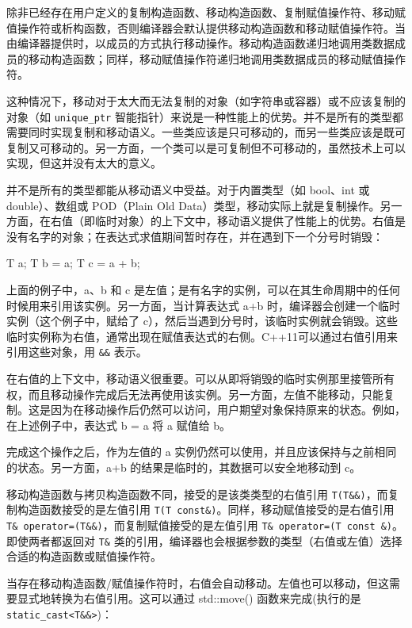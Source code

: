 
除非已经存在用户定义的复制构造函数、移动构造函数、复制赋值操作符、移动赋值操作符或析构函数，否则编译器会默认提供移动构造函数和移动赋值操作符。当由编译器提供时，以成员的方式执行移动操作。移动构造函数递归地调用类数据成员的移动构造函数；同样，移动赋值操作符递归地调用类数据成员的移动赋值操作符。

这种情况下，移动对于太大而无法复制的对象（如字符串或容器）或不应该复制的对象（如 \verb|unique_ptr| 智能指针）来说是一种性能上的优势。并不是所有的类型都需要同时实现复制和移动语义。一些类应该是只可移动的，而另一些类应该是既可复制又可移动的。另一方面，一个类可以是可复制但不可移动的，虽然技术上可以实现，但这并没有太大的意义。

并不是所有的类型都能从移动语义中受益。对于内置类型（如 bool、int 或 double）、数组或 POD（Plain Old Data）类型，移动实际上就是复制操作。另一方面，在右值（即临时对象）的上下文中，移动语义提供了性能上的优势。右值是没有名字的对象；在表达式求值期间暂时存在，并在遇到下一个分号时销毁：

\begin{cpp}
T a;
T b = a;
T c = a + b;
\end{cpp}

上面的例子中，a、b 和 c 是左值；是有名字的实例，可以在其生命周期中的任何时候用来引用该实例。另一方面，当计算表达式 a+b 时，编译器会创建一个临时实例（这个例子中，赋给了 c），然后当遇到分号时，该临时实例就会销毁。这些临时实例称为右值，通常出现在赋值表达式的右侧。C++11可以通过右值引用来引用这些对象，用 \verb|&&| 表示。

在右值的上下文中，移动语义很重要。可以从即将销毁的临时实例那里接管所有权，而且移动操作完成后无法再使用该实例。另一方面，左值不能移动，只能复制。这是因为在移动操作后仍然可以访问，用户期望对象保持原来的状态。例如，在上述例子中，表达式 b = a 将 a 赋值给 b。

完成这个操作之后，作为左值的 a 实例仍然可以使用，并且应该保持与之前相同的状态。另一方面，a+b 的结果是临时的，其数据可以安全地移动到 c。

移动构造函数与拷贝构造函数不同，接受的是该类类型的右值引用 \verb|T(T&&)|，而复制构造函数接受的是左值引用 \verb|T(T const&)|。同样，移动赋值接受的是右值引用 \verb|T& operator=(T&&)|，而复制赋值接受的是左值引用 \verb|T& operator=(T const &)|。即使两者都返回对 \verb|T&| 类的引用，编译器也会根据参数的类型（右值或左值）选择合适的构造函数或赋值操作符。

当存在移动构造函数/赋值操作符时，右值会自动移动。左值也可以移动，但这需要显式地转换为右值引用。这可以通过 std::move() 函数来完成(执行的是 \verb|static_cast<T&&>|)：

